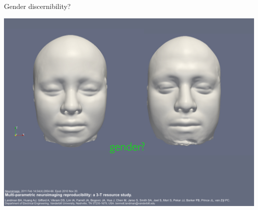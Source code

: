 \documentclass[ignorenonframetext,]{beamer}
\begin{document}
\begin{frame}{Gender discernibility?}

\includegraphics{./papers/figures/template5.jpg}

\end{frame}
\end{document}
